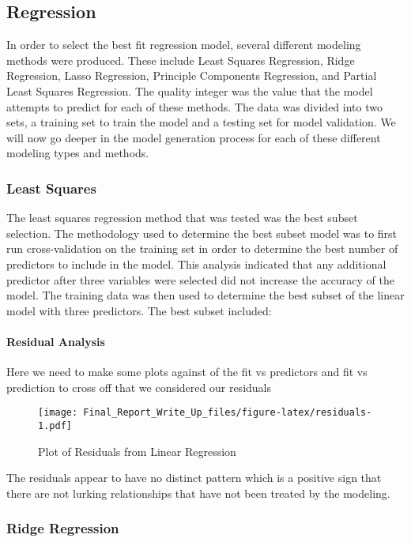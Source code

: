 \documentclass[]{article}
\let\oldparagraph\paragraph
\renewcommand{\paragraph}[1]{\oldparagraph{#1}\mbox{}}
\begin{document}
\subsection{Regression}\label{regression}

In order to select the best fit regression model, several different
modeling methods were produced. These include Least Squares Regression,
Ridge Regression, Lasso Regression, Principle Components Regression, and
Partial Least Squares Regression. The quality integer was the value that
the model attempts to predict for each of these methods. The data was
divided into two sets, a training set to train the model and a testing
set for model validation. We will now go deeper in the model generation
process for each of these different modeling types and methods.

\subsubsection{Least Squares}\label{least-squares}

The least squares regression method that was tested was the best subset
selection. The methodology used to determine the best subset model was
to first run cross-validation on the training set in order to determine
the best number of predictors to include in the model. This analysis
indicated that any additional predictor after three variables were
selected did not increase the accuracy of the model. The training data
was then used to determine the best subset of the linear model with
three predictors. The best subset included:

\paragraph{Residual Analysis}\label{residual-analysis}

Here we need to make some plots against of the fit vs predictors and fit
vs prediction to cross off that we considered our residuals

\begin{figure}[htbp]
\centering
\texttt{[image: Final\_Report\_Write\_Up\_files/figure-latex/residuals-1.pdf]}
\caption{Plot of Residuals from Linear Regression}
\end{figure}

The residuals appear to have no distinct pattern which is a positive
sign that there are not lurking relationships that have not been treated
by the modeling.

\subsubsection{Ridge Regression}\label{ridge-regression}
\end{document}
